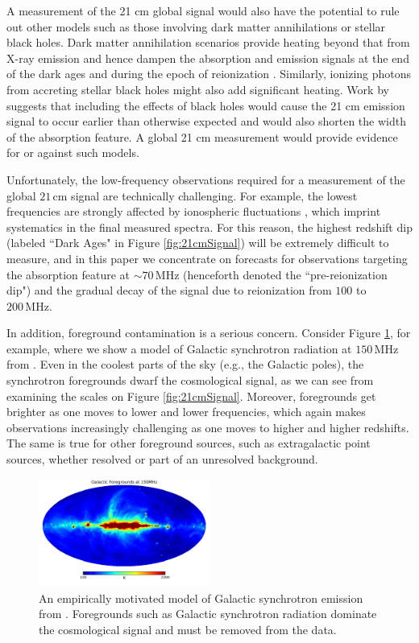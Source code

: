 \documentclass[twocolumn,apj,numberedappendix]{emulateapj}
\begin{document}
A measurement of the 21 cm global signal would also have the potential to rule out other models such as those involving dark matter annihilations or stellar black holes. Dark matter annihilation scenarios provide heating beyond that from X-ray emission and hence dampen the absorption and emission signals at the end of the dark ages and during the epoch of reionization \citep{Valdes2013_DM,Evoli2014}. Similarly, ionizing photons from accreting stellar black holes might also add significant heating. Work by \citet{Mirabel_stellar_bh} suggests that including the effects of black holes would cause the 21 cm emission signal to occur earlier than otherwise expected and would also shorten the width of the absorption feature. A global 21 cm measurement would provide evidence for or against such models.

Unfortunately, the low-frequency observations required for a measurement of the global $21\,\textrm{cm}$ signal are technically challenging. For example, the lowest frequencies are strongly affected by ionospheric fluctuations \citep{VedanthamIonosphere,DattaIonosphere,Rogers_etal_Ionosphere}, which imprint systematics in the final measured spectra. For this reason, the 
highest redshift dip (labeled ``Dark Ages" in Figure \ref{fig:21cmSignal}) will be extremely difficult to measure, and in this paper we concentrate on forecasts for observations targeting the absorption feature at $\sim 70 \,\textrm{MHz}$ (henceforth denoted the ``pre-reionization dip") and the gradual decay of the signal due to reionization from $100$ to $200\,\textrm{MHz}$.

In addition, foreground contamination is a serious concern. Consider Figure \ref{fig:GSM}, for example, where we show a model of Galactic synchrotron radiation at $150\,\textrm{MHz}$ from \citet{angelicaGSM}. Even in the coolest parts of the sky (e.g., the Galactic poles), the synchrotron foregrounds dwarf the cosmological signal, as we can see from examining the scales on Figure \ref{fig:21cmSignal}. Moreover, foregrounds get brighter as one moves to lower and lower frequencies, which again makes observations increasingly challenging as one moves to higher and higher redshifts. The same is true for other foreground sources, such as extragalactic point sources, whether resolved or part of an unresolved background.

\begin{figure}[!]
	\centering
	\includegraphics[width=0.5\textwidth]{figures/Haslam_150MHz.pdf}
	\caption{An empirically motivated model of Galactic synchrotron emission from \citet{angelicaGSM}. Foregrounds such as Galactic synchrotron radiation dominate the cosmological signal and must be removed from the data.}
	\label{fig:GSM}
\end{figure}
\end{document}
